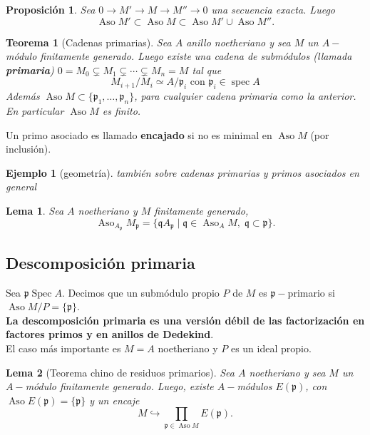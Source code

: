 \documentclass[12pt]{book}
\newtheorem{eje}{Ejemplo}
\newtheorem{teo}{Teorema}
\newtheorem{lem}{Lema}
\newtheorem{pro}{Proposición}
\newcommand{\aso}{\operatorname{Aso}}
\newcommand{\spec}{\operatorname{Spec}}
\newcommand{\pp}{\mathfrak{p}}
\begin{document}
\begin{pro}
Sea $0\rightarrow M' \rightarrow M \rightarrow M'' \rightarrow 0$ una secuencia exacta. Luego $$ \aso M' \subset \aso M \subset \aso M' \cup \aso M'' .$$
\end{pro}

\begin{teo}[Cadenas primarias]

Sea $A$ anillo noetheriano y sea $M$ un $A-$módulo finitamente generado. Luego existe una cadena de submódulos (llamada \textbf{primaria}) $ 0= M_0 \subsetneq M_1 \subsetneq \cdots \subsetneq M_n =M $ tal que $$ M_{i+1} / M_i \simeq A/ \mathfrak{p}_i  \mbox{ con } \mathfrak{p}_i \in \operatorname{spec}A $$
Además $\aso M \subset \{\mathfrak{p}_1 , \ldots , \mathfrak{p}_n \}$, para cualquier cadena primaria como la anterior. En particular $\aso M$ es finito.
\end{teo}


Un primo asociado es llamado \textbf{encajado} si no es minimal en $\operatorname{Aso}M$ (por inclusión).

\begin{eje}[geometría]
también sobre cadenas primarias y primos asociados en general
\end{eje}


\begin{lem}
Sea $A$ noetheriano y $M$ finitamente generado,
$$ \aso _{A _ \pp} M_\pp = \{ \mathfrak{q} A _\pp \; | \; \mathfrak{q} \in \aso _A M, \; \mathfrak{q} \subset \pp  \} .$$
\end{lem}


\subsection{Descomposición primaria}
Sea $\mathfrak{p} \spec A$. Decimos que un submódulo propio $P$ de $M$ es $\pp-$primario si $\aso M/P =\{\pp\}$.\\
\textbf{La descomposición primaria es una versión débil de las factorización en factores primos y en anillos de Dedekind}.\\
El caso más importante es $M= A$ noetheriano y $P$ es un ideal propio.


\begin{lem}[Teorema chino de residuos primarios]
Sea $A$ noetheriano y sea $M$ un $A-$módulo finitamente generado. Luego, existe $A-$módulos $E (\mathfrak{p})$, con $\aso E(\pp) = \{\pp\}$ y un encaje $$ M \hookrightarrow \prod _{\pp \in \aso M } E(\pp). $$
\end{lem}
\end{document}
